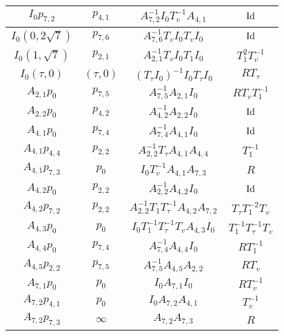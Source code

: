 \documentclass{article}[12pt]
\begin{document}
\begin{table}
\begin{center}
{\begin{tabular}{|c|c|c|c|}
$I_0 p_{7,2}$ & $p_{4,1}$ & $A_{7,2}^{-1}I_0T_v^{-1}A_{4,1}$ & ${\rm Id}$\\
\hline

$I_0 (0,2\sqrt{7})$ & $p_{7,6}$ & $A_{7,6}^{-1}T_v I_0T_vI_0$ & ${\rm Id}$\\
\hline

$I_0 (1,\sqrt{7})$ & $p_{2,1}$ & $A_{2,1}^{-1}T_v I_0T_1I_0$ & $T_1^2T_v^{-1}$\\
\hline

$I_0 (\tau,0)$ & $(\tau,0)$ & $(T_\tau I_0)^{-1}I_0T_\tau I_0$ & $R T_\tau$\\
\hline

$A_{2,1}p_0$ & $p_{7,5}$ & $A_{7,5}^{-1}A_{2,1}I_0$ & $RT_vT_1^{-1}$\\
\hline

$A_{2,2}p_0$ & $p_{4,2}$ & $A_{4,2}^{-1}A_{2,2}I_0$ & ${\rm Id}$\\
\hline

$A_{4,1}p_0$ & $p_{7,4}$ & $A_{7,4}^{-1}A_{4,1}I_0$ & ${\rm Id}$\\
\hline

$A_{4,1}p_{4,4}$ & $p_{2,2}$ & $A_{2,2}^{-1}T_\tau A_{4,1}A_{4,4}$ & $T_1^{-1}$\\
\hline

$A_{4,1}p_{7,3}$ & $p_0$ & $I_0T_v^{-1}A_{4,1}A_{7,3}$ & $R$\\
\hline

$A_{4,2}p_0$ & $p_{2,2}$ & $A_{2,2}^{-1}A_{4,2}I_0$ & ${\rm Id}$\\
\hline

$A_{4,2}p_{7,2}$ & $p_{2,2}$ & $A_{2,2}^{-1}T_1T_\tau ^{-1}A_{4,2}A_{7,2}$ & $T_\tau T_1^{-2}T_v  $\\
\hline

$A_{4,3}p_0$ & $p_0$ & $I_0T_1^{-1}T_\tau ^{-1}T_v A_{4,3}I_0$ & $T_1^{-1}T_\tau ^{-1}T_v$\\
\hline

$A_{4,4} p_0$ & $p_{7,4}$ & $A_{7,4}^{-1}A_{4,4}I_0$ & $RT_1^{-1}$\\
\hline

$A_{4,5} p_{2,2}$ & $p_{7,5}$ & $A_{7,5}^{-1}A_{4,5}A_{2,2}$ & $RT_v$\\
\hline

$A_{7,1}p_0$ & $p_0$ & $I_0A_{7,1}I_0$ & $RT_v^{-1}$\\
\hline

$A_{7,2}p_{4,1}$ & $p_0$ & $I_0A_{7,2}A_{4,1}$ & $T_v^{-1}$\\
\hline

$A_{7,2}p_{7,3}$ & $\infty$ & $A_{7,2}A_{7,3}$ & $R$\\
\hline


\end{tabular}}
\end{center}
\end{table}
\end{document}
